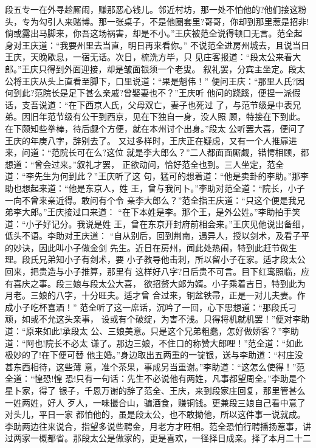 段五专一在外寻趁厮闹，赚那恶心钱儿。邻近村坊，那一处不怕他的?他们接这粉
头，专为勾引人来赌博。那一张桌子，不是他圈套里?哥哥，你却到那里惹是招非!
倘或露出马脚来，你吾这场祸害，却是不小。”王庆被范全说得顿口无言。范全起
身对王庆道：“我要州里去当直，明日再来看你。”
不说范全进房州城去，且说当日王庆，天晚歇息，一宿无话。次日，梳洗方毕，只
见庄客报道：“段太公来看大郎。”王庆只得到外面迎接，却是皱面银须一个老叟。
叙礼罢，分宾主坐定。段太公将王庆从头上直看至脚下，口里说道：“果是魁伟！”
便问王庆：“那里人氏?因何到此?范院长是足下甚么亲戚?曾娶妻也不？”王庆听
他问的跷蹊，便捏一派假话，支吾说道：“在下西京人氏，父母双亡，妻子也死过
了，与范节级是中表兄弟。因旧年范节级有公干到西京，见在下独自一身，没人照
顾，特接在下到此。在下颇知些拳棒，待后觑个方便，就在本州讨个出身。”段太
公听罢大喜，便问了王庆的年庚八字，辞别去了。
又过多样时，王庆正在疑虑，又有一个人推扉进来，问道：“范院长可在么?这位
就是李大郎么？”二人都面面厮觑，错愕相顾，都想道：“曾会过来。”叙礼才罢，
正欲动问，恰好范全也到。三人坐定，范全道：“李先生为何到此？”王庆听了这
句，猛可的想着道：“他是卖卦的李助。”那李助也想起来道：“他是东京人，姓
王，曾与我问卜。”李助对范全道：“院长，小子一向不曾来亲近得。敢问有个令
亲李大郎么？”范全指王庆道：“只这个便是我兄弟李大郎。”王庆接过口来道：
“在下本姓是李。那个王，是外公姓。”李助拍手笑道：“小子好记分。我说是姓
王，曾在东京开封府前相会来。”王庆见他说出备细，低头不语。李助对王庆道：
“自从别后，回到荆南，遇异人，授以剑术，及看子平的妙诀，因此叫小子做金剑
先生。近日在房州，闻此处热闹，特到此赶节做生理。段氏兄弟知小子有剑术，要
小子教导他击刺，所以留小子在家。适才段太公回来，把贵造与小子推算，那里有
这样好八字?日后贵不可言。目下红鸾照临，应有喜庆之事。段三娘与段太公大喜，
欲招赘大郎为婿。小子乘着吉日，特到此为月老。三娘的八字，十分旺夫。适才曾
合过来，铜盆铁帚，正是一对儿夫妻。作成小子吃杯喜酒！”
范全听了这一席话，沉吟了一回，心下思想道：“那段氏刁顽，如或不允这头亲事，
设或有个破绽，为害不浅。只得将机就机罢！”便对李助道：“原来如此!承段太
公、三娘美意。只是这个兄弟粗蠢，怎好做娇客？”李助道：“阿也!院长不必太
谦了。那边三娘，不住口的称赞大郎哩！”范全道：“如此极妙的了!在下便可替
他主婚。”身边取出五两重的一锭银，送与李助道：“村庄没甚东西相待，这些薄
意，准个茶果，事成另当重谢。”李助道：“这怎么使得！”范全道：“惶恐!惶
恐!只有一句话：先生不必说他有两姓，凡事都望周全。”李助是个星卜家，得了
银子，千恩万谢的辞了范全、王庆，来到段家庄回复，那里管甚么一姓两姓，好人
歹人，一味撮合山，骗酒食，赚铜钱。更兼段三娘自己看中意了对头儿，平日一家
都怕他的，虽是段太公，也不敢拗他，所以这件事一说就成。
李助两边往来说合，指望多说些聘金，月老方才旺相。范全恐怕行聘播扬惹事，讲
过两家一概都省。那段太公是做家的，更是喜欢，一径择日成亲。择了本月二十二
